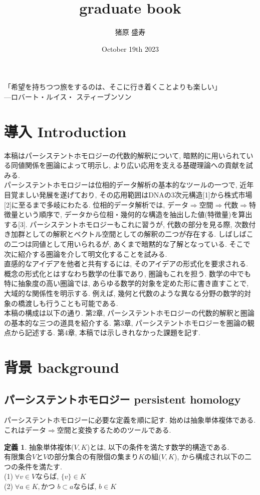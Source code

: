 \documentclass[a4paper]{jsarticle}
\title{graduate book}
\author{猪原 盛寿}
\date{October 19th 2023}
\theoremstyle{definition}
\newtheorem{dfn}{定義}[section]
\begin{document}
\Large
\maketitle
「希望を持ちつつ旅をするのは、そこに行き着くことよりも楽しい」\\
---ロバート・ルイス・ スティーブンソン
\section{導入 Introduction}
本稿はパーシステントホモロジーの代数的解釈について, 暗黙的に用いられている同値関係を圏論によって明示し, より広い応用を支える基礎理論への貢献を試みる. \\

パーシステントホモロジーは位相的データ解析の基本的なツールの一つで, 近年目覚ましい発展を遂げており, その応用範囲はDNAの3次元構造[1]から株式市場[2]に至るまで多岐にわたる. 位相的データ解析では, データ$\Rightarrow$空間$\Rightarrow$代数$\Rightarrow$特徴量という順序で, データから位相・幾何的な構造を抽出した値(特徴量)を算出する[3]. パーシステントホモロジーもこれに習うが, 代数の部分を見る際, 次数付き加群としての解釈とベクトル空間としての解釈の二つが存在する. しばしばこの二つは同値として用いられるが, あくまで暗黙的な了解となっている. そこで次に紹介する圏論を介して明文化することを試みる. \\

直感的なアイデアを他者と共有するには, そのアイデアの形式化を要求される. 概念の形式化とはすなわち数学の仕事であり, 圏論もこれを担う. 数学の中でも特に抽象度の高い圏論では, あらゆる数学的対象を定めた形に書き直すことで, 大域的な関係性を明示する. 例えば, 幾何と代数のような異なる分野の数学的対象の橋渡しも行うことも可能である. \\

本稿の構成は以下の通り. 第2章, パーシステントホモロジーの代数的解釈と圏論の基本的な三つの道具を紹介する. 第3章, パーシステントホモロジーを圏論の観点から記述する. 第4章, 本稿では示しきれなかった課題を記す.
\section{背景 background}
\subsection{パーシステントホモロジー persistent homology}
パーシステントホモロジーに必要な定義を順に記す. 始めは抽象単体複体である. これはデータ$\Rightarrow$空間と変換するためのツールである. 
\begin{dfn}
    抽象単体複体($V,K$)とは, 以下の条件を満たす数学的構造である.\\
    有限集合$V$と$V$の部分集合の有限個の集まり$K$の組($V,K$), から構成され以下の二つの条件を満たす.\\
    \noindent
    (1)$\; \forall v\in V$ならば, $\{v\}\in K$ \\
    (2)$\; \forall a\in K,$かつ $b\subset a$ならば, $b\in K$
\end{dfn}
\end{document}
